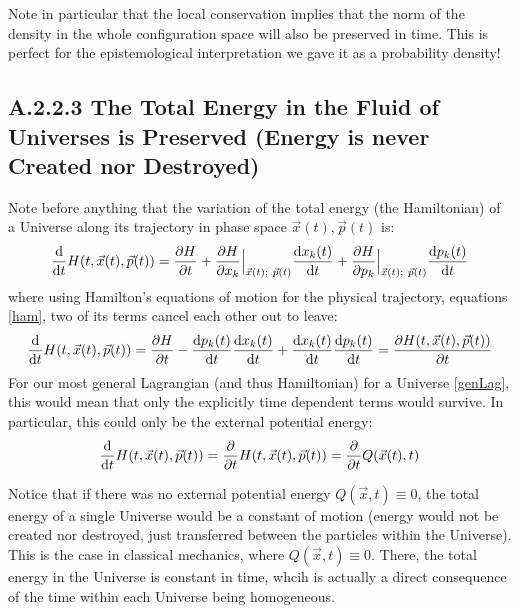 \documentclass[11pt, a4paper]{article} %
\begin{document}
Note in particular that the local conservation implies that the norm of the density in the whole configuration space will also be preserved in time. This is perfect for the epistemological interpretation we gave it as a probability density!


\subsection*{A.2.2.3 The Total Energy in the Fluid of Universes is Preserved (Energy is never Created nor Destroyed)}
Note before anything that the variation of the total energy (the Hamiltonian) of a Universe along its trajectory in phase space $\vec{x}(t),\vec{p}(t)$ is:
\begin{equation}
\dv{}{t}H\qty(t, \vec{x}(t), \vec{p}(t))=\pdv{H}{t}+\pdv{H}{x_k}\Big\rvert_{\vec{x}(t);\ \vec{p}(t)}\dv{x_k(t)}{t}+\pdv{H}{p_k}\Big\rvert_{\vec{x}(t);\ \vec{p}(t)}\dv{p_k(t)}{t}
\end{equation}
where using Hamilton's equations of motion for the physical trajectory, equations \eqref{ham}, two of its terms cancel each other out to leave:
\begin{equation}
\dv{}{t}H\qty(t, \vec{x}(t), \vec{p}(t))=\pdv{H}{t}-\dv{p_k(t)}{t}\dv{x_k(t)}{t}+\dv{x_k(t)}{t}\dv{p_k(t)}{t}=\pdv{H\qty(t, \vec{x}(t), \vec{p}(t))}{t}
\end{equation}
For our most general Lagrangian (and thus Hamiltonian) for a Universe \eqref{genLag}, this would mean that only the explicitly time dependent terms would survive. In particular, this could only be the external potential energy:
\begin{equation}\label{mutandi}
\dv{}{t}H\qty(t, \vec{x}(t), \vec{p}(t))=\pdv{}{t}H\qty(t, \vec{x}(t), \vec{p}(t))=\pdv{}{t}Q(\vec{x}(t),t)
\end{equation}

Notice that if there was no external potential energy $Q(\vec{x},t)\equiv0$, the total energy of a single Universe would be a constant of motion (energy would not be created nor destroyed, just transferred between the particles within the Universe). This is the case in classical mechanics, where $Q(\vec{x},t)\equiv0$. There, the total energy in the Universe is constant in time, whcih is actually a direct consequence of the time within each Universe being homogeneous.
\end{document}
